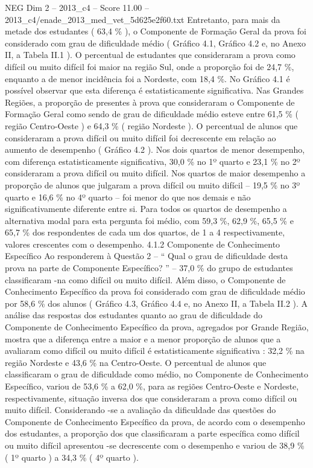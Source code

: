 \begin{textsample}{NEG Dim 2 – 2013\_c4 – Score 11.00 – 2013\_c4/enade\_2013\_med\_vet\_5d625e2f60.txt}
Entretanto, para mais da metade dos estudantes ( 63,4 \% ), o Componente de Formação Geral da prova foi considerado com grau de dificuldade médio ( Gráfico 4.1, Gráfico 4.2 e, no Anexo II, a Tabela II.1 ).
O percentual de estudantes que consideraram a prova como difícil ou muito difícil foi maior na região Sul, onde a proporção foi de 24,7 \%, enquanto a de menor incidência foi a Nordeste, com 18,4 \%.
No Gráfico 4.1 é possível observar que esta diferença é estatisticamente significativa.
Nas Grandes Regiões, a proporção de presentes à prova que consideraram o Componente de Formação Geral como sendo de grau de dificuldade médio esteve entre 61,5 \% ( região Centro-Oeste ) e 64,3 \% ( região Nordeste ).
O percentual de alunos que consideraram a prova difícil ou muito difícil foi decrescente em relação ao aumento de desempenho ( Gráfico 4.2 ).
Nos dois quartos de menor desempenho, com diferença estatisticamente significativa, 30,0 \% no 1º quarto e 23,1 \% no 2º consideraram a prova difícil ou muito difícil.
Nos quartos de maior desempenho a proporção de alunos que julgaram a prova difícil ou muito difícil – 19,5 \% no 3º quarto e 16,6 \% no 4º quarto – foi menor do que nos demais e não significativamente diferente entre si.
Para todos os quartos de desempenho a alternativa modal para esta pergunta foi médio, com 59,3 \%, 62,9 \%, 65,5 \% e 65,7 \% dos respondentes de cada um dos quartos, de 1 a 4 respectivamente, valores crescentes com o desempenho. 4.1.2 Componente de Conhecimento Específico Ao responderem à Questão 2 – “ Qual o grau de dificuldade desta prova na parte de Componente Específico? ” – 37,0 \% do grupo de estudantes classificaram -na como difícil ou muito difícil.
Além disso, o Componente de Conhecimento Específico da prova foi considerado com grau de dificuldade médio por 58,6 \% dos alunos ( Gráfico 4.3, Gráfico 4.4 e, no Anexo II, a Tabela II.2 ).
A análise das respostas dos estudantes quanto ao grau de dificuldade do Componente de Conhecimento Específico da prova, agregados por Grande Região, mostra que a diferença entre a maior e a menor proporção de alunos que a avaliaram como difícil ou muito difícil é estatisticamente significativa : 32,2 \% na região Nordeste e 43,6 \% na Centro-Oeste.
O percentual de alunos que classificaram o grau de dificuldade como médio, no Componente de Conhecimento Específico, variou de 53,6 \% a 62,0 \%, para as regiões Centro-Oeste e Nordeste, respectivamente, situação inversa dos que consideraram a prova como difícil ou muito difícil.
Considerando -se a avaliação da dificuldade das questões do Componente de Conhecimento Específico da prova, de acordo com o desempenho dos estudantes, a proporção dos que classificaram a parte específica como difícil ou muito difícil apresentou -se decrescente com o desempenho e variou de 38,9 \% ( 1º quarto ) a 34,3 \% ( 4º quarto ).

\end{textsample}
